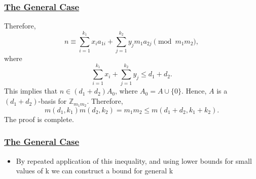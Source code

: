 \documentclass{beamer}
\def\Z{\mbox{$\mathbb Z$}}
\begin{document}
\frame
{\frametitle{\underline{The General Case}}
 Therefore,
\[
n\equiv\sum_{i=1}^{k_1}x_{i}a_{1i}+\sum_{j=1}^{k_2}y_{j}m_1a_{2j}\pmod{m_1m_2},
\]
where
\[
\sum_{i=1}^{k_{1}}x_{i}+\sum_{j=1}^{k_{2}}y_{j}\le d_{1}+d_{2}.
\]
This implies that $n\in (d_1+d_2)A_{0}$, where $A_{0}=A\cup\{0\}$. Hence, $A$ is a $(d_{1}+d_{2})$-basis for $\Z_{m_1m_2}$. Therefore,
\[
m(d_{1},k_{1})m(d_{2},k_{2})=m_{1}m_{2}\le m(d_{1}+d_{2},k_{1}+k_{2}).
\]
The proof is complete.

}

\frame
{
\frametitle{\underline{The General Case}}
\begin{itemize}
\item<1->By repeated application of this inequality, and using lower bounds for small values of k
we can construct a bound for general k 

\end{itemize}
}
\end{document}
